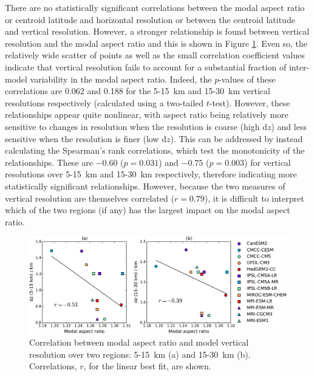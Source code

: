 There are no statistically significant correlations between the modal aspect
ratio or centroid latitude and horizontal resolution or between the centroid
latitude and vertical resolution. However, a stronger relationship is found
between vertical resolution and the modal aspect ratio and this is shown in
Figure \ref{fig:aspect_vert_res}. Even so, the relatively wide scatter of points
as well as the small correlation coefficient values indicate that vertical
resolution fails to account for a substantial fraction of inter-model
variability in the modal aspect ratio. Indeed, the $p$-values of these
correlations are 0.062 and 0.188 for the 5-15~km and 15-30~km vertical
resolutions respectively (calculated using a two-tailed $t$-test). However,
these relationships appear quite nonlinear, with aspect ratio being relatively
more sensitive to changes in resolution when the resolution is coarse (high
$\mathrm{d}z$) and less sensitive when the resolution is finer (low
$\mathrm{d}z$). This can be addressed by instead calculating the Spearman's rank
correlations, which test the monotonicity of the relationships. These are
$-0.60$ ($p=0.031$) and $-0.75$ ($p=0.003$) for vertical resolutions over
5-15~km and 15-30~km respectively, therefore indicating more statistically
significant relationships. However, because the two measures of vertical
resolution are themselves correlated ($r=0.79$), it is difficult to interpret
which of the two regions (if any) has the largest impact on the modal aspect
ratio.

\begin{figure}
 \centering
 \noindent\includegraphics[width=\textwidth]{figures/chapter-models/aspect_ratio_resolution.pdf}
 \caption[Vertical resolution and modal aspect ratio]{Correlation between modal
   aspect ratio and model vertical resolution over two regions: 5-15~km (a) and
   15-30~km (b). Correlations, $r$, for the linear best fit, are shown.}
 \label{fig:aspect_vert_res}
\end{figure}

